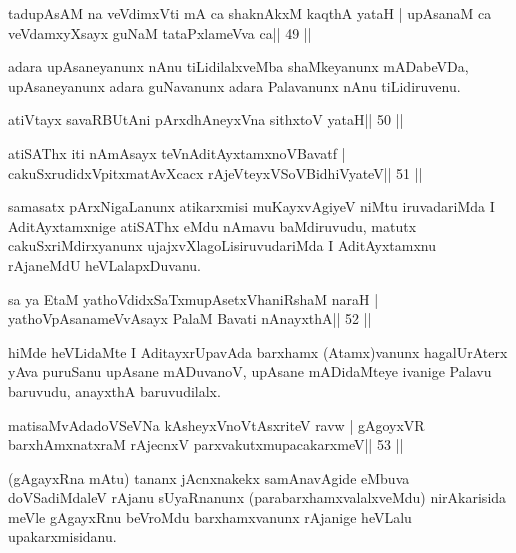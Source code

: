 
\begin{shl}
tadupAsAM na veVdimxVti mA ca shaknAkxM kaqthA yataH |
upAsanaM ca veVdamxyXsayx guNaM tataPxlameVva ca\hfill || 49 ||
\end{shl}

\begin{artha}
adara upAsaneyanunx nAnu tiLidilalxveMba shaMkeyanunx mADabeVDa, upAsaneyanunx adara guNavanunx adara Palavanunx nAnu tiLidiruvenu.
\end{artha}



\begin{shl}
atiVtayx savaRBUtAni pArxdhAneyxVna sithxtoV yataH\hfill || 50 ||
\end{shl}

\begin{shl}
atiSAThx iti nAmAsayx teVnAditAyxtamxnoV\s Bavatf |
cakuSxrudidxVpitxmatAvXcacx rAjeVteyxVSoV\s BidhiVyateV\hfill || 51 ||
\end{shl}

\begin{artha}
samasatx pArxNigaLanunx atikarxmisi muKayxvAgiyeV niMtu iruvadariMda I  AditAyxtamxnige atiSAThx eMdu nAmavu baMdiruvudu, matutx  cakuSxriMdirxyanunx ujajxvXlagoLisiruvudariMda I AditAyxtamxnu rAjaneMdU heVLalapxDuvanu.
\end{artha}

\begin{shl}
sa ya EtaM yathoVdidxSaTxmupAsetxV\s haniRshaM naraH |
yathoVpAsanameVvAsayx PalaM Bavati nAnayxthA\hfill || 52 ||
\end{shl}

\begin{artha}
hiMde heVLidaMte I AditayxrUpavAda barxhamx (Atamx)vanunx hagalUrAterx yAva puruSanu upAsane mADuvanoV, upAsane mADidaMteye ivanige Palavu baruvudu, anayxthA baruvudilalx.
\end{artha}

\begin{shl}
matisaMvAdadoVSeVNa kAsheyxVnoVtAsxriteV ravw |
gAgoyxVR barxhAmxnatxraM rAjecnxV parxvakutxmupacakarxmeV\hfill || 53 ||
\end{shl}

\begin{artha}
(gAgayxRna mAtu) tananx jAcnxnakekx samAnavAgide  eMbuva doVSadiMdaleV rAjanu sUyaRnanunx (parabarxhamxvalalxveMdu) nirAkarisida meVle gAgayxRnu beVroMdu barxhamxvanunx rAjanige heVLalu upakarxmisidanu.
\end{artha} 

